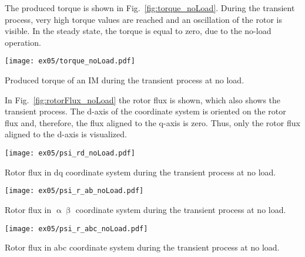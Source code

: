 \begin{solutionblock}
    The produced torque is shown in Fig.~\ref{fig:torque_noLoad}. During the transient process, very high torque values are reached and an oscillation of the rotor is visible. In the steady state, the torque is equal to zero, due to the no-load operation.
    \begin{solutionfigure}
        \centering
        \texttt{[image: ex05/torque\_noLoad.pdf]}
        \caption{Produced torque of an IM during the transient process at no load.}
        \label{fig:torque_noLoad}
    \end{solutionfigure}

    In Fig.~\ref{fig:rotorFlux_noLoad} the rotor flux is shown, which also shows the transient process. The d-axis of the coordinate system is oriented on the rotor flux and, therefore, the flux aligned to the q-axis is zero. Thus, only the rotor flux aligned to the d-axis is visualized.
    \begin{solutionfigure}
        \centering
        \texttt{[image: ex05/psi\_rd\_noLoad.pdf]}
        \caption{Rotor flux in dq coordinate system during the transient process at no load.}
        \label{fig:rotorFlux_noLoad}
    \end{solutionfigure}

    \begin{solutionfigure}
        \centering
        \texttt{[image: ex05/psi\_r\_ab\_noLoad.pdf]}
        \caption{Rotor flux in $\upalpha\upbeta$ coordinate system during the transient process at no load.}
        \label{fig:rotorFlux_r_ab_noLoad}
    \end{solutionfigure}

    \begin{solutionfigure}
        \centering
        \texttt{[image: ex05/psi\_r\_abc\_noLoad.pdf]}
        \caption{Rotor flux in abc coordinate system during the transient process at no load.}
        \label{fig:rotorFlux_r_abc_noLoad}
    \end{solutionfigure}

\end{solutionblock}


\FloatBarrier


